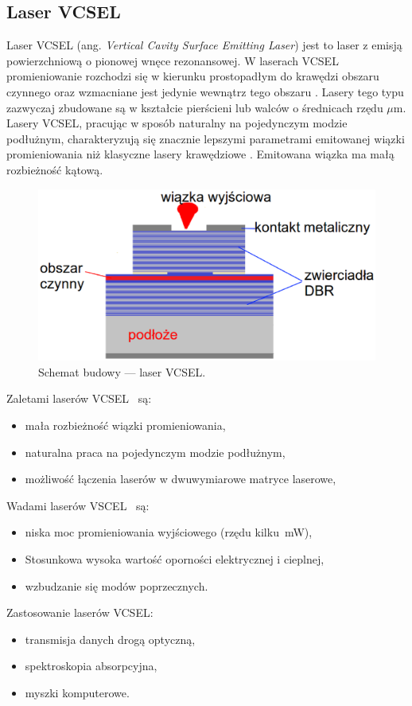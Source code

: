 \subsection{Laser VCSEL}
Laser VCSEL (ang. \textit{Vertical Cavity Surface Emitting Laser}) jest to laser z emisją powierzchniową o pionowej wnęce rezonansowej.
W laserach VCSEL promieniowanie rozchodzi się w kierunku prostopadłym do krawędzi obszaru czynnego oraz wzmacniane jest jedynie
wewnątrz tego obszaru \cite{publikcja_nakwaski}. Lasery tego typu zazwyczaj zbudowane są w kształcie pierścieni
lub walców o średnicach rzędu $\mathtt{\mu}$m.  Lasery VCSEL,   pracując   w   sposób   naturalny   na   pojedynczym   modzie  podłużnym,  charakteryzują się
znacznie lepszymi parametrami emitowanej wiązki promieniowania  niż
klasyczne  lasery krawędziowe \cite{publikcja_magda}. Emitowana wiązka ma małą rozbieżność kątową.
\begin{figure}[H]
\center
\includegraphics[scale=0.25]{vcsel2.eps}
\caption{Schemat budowy --- laser VCSEL.}
\label{fig:teoria_rys_3}
\end{figure}
\hspace{-0.8cm}
Zaletami laserów VCSEL~\cite{publikcja_nakwaski} są:
\begin{itemize}
\item mała rozbieżność wiązki promieniowania,
\item naturalna praca na pojedynczym modzie podłużnym,
\item możliwość łączenia laserów w dwuwymiarowe matryce laserowe,
\end{itemize}
Wadami laserów VSCEL~\cite{publikcja_nakwaski} są:
\begin{itemize}
\item niska moc promieniowania wyjściowego (rzędu kilku \,mW),
\item Stosunkowa wysoka wartość oporności elektrycznej i cieplnej,
\item wzbudzanie się modów poprzecznych.
\end{itemize}
Zastosowanie laserów VCSEL:
\begin{itemize}
\item transmisja danych drogą optyczną,
\item spektroskopia absorpcyjna,
\item myszki komputerowe.
\end{itemize}
